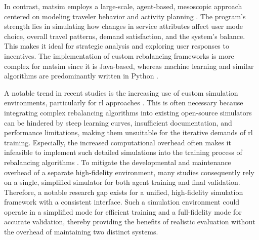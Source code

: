 In contrast, \gls{matsim} employs a large-scale, agent-based, mesoscopic approach centered on modeling traveler behavior and activity planning \cite{horni_introducing_2016}.
The program's strength lies in simulating how changes in service attributes affect user mode choice, overall travel patterns, demand satisfaction, and the system's balance.
This makes it ideal for strategic analysis and exploring user responses to incentives.
The implementation of custom rebalancing frameworks is more complex for \gls{matsim} since it is Java-based, whereas machine learning and similar algorithms are predominantly written in Python \cite{chouaki_review_2025}.

A notable trend in recent studies is the increasing use of custom simulation environments, particularly for \gls{rl} approaches \cite{chouaki_review_2025}.
This is often necessary because integrating complex rebalancing algorithms into existing open-source simulators can be hindered by steep learning curves, insufficient documentation, and performance limitations, making them unsuitable for the iterative demands of \gls{rl} training.
Especially, the increased computational overhead often makes it infeasible to implement such detailed simulations into the training process of rebalancing algorithms \cite{losapio_smart_2022}.
To mitigate the developmental and maintenance overhead of a separate high-fidelity environment, many studies consequently rely on a single, simplified simulator for both agent training and final validation.
Therefore, a notable research gap exists for a unified, high-fidelity simulation framework with a consistent interface.
Such a simulation environment could operate in a simplified mode for efficient training and a full-fidelity mode for accurate validation, thereby providing the benefits of realistic evaluation without the overhead of maintaining two distinct systems.
\\


